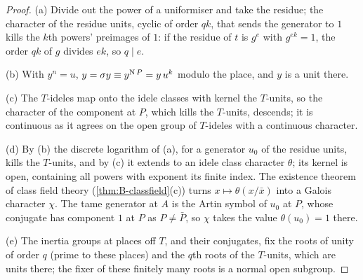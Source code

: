 \begin{proof}
(a) Divide out the power of a uniformiser and take the residue; the character of the residue units, cyclic of order $qk$, that sends the generator to $1$ kills the $k$th powers' preimages of $1$: if the residue of $t$ is $g^e$ with $g^{ek}=1$, the order $qk$ of $g$ divides $ek$, so $q\mid e$.

(b) With $y^n=u$, $y=\sigma y\equiv y^{\operatorname{N} P}=y\,u^k$ modulo the place, and $y$ is a unit there.

(c) The $T$-ideles map onto the idele classes with kernel the $T$-units, so the character of the component at $P$, which kills the $T$-units, descends; it is continuous as it agrees on the open group of $T$-ideles with a continuous character.

(d) By (b) the discrete logarithm of (a), for a generator $u_0$ of the residue units, kills the $T$-units, and by (c) it extends to an idele class character $\theta$; its kernel is open, containing all powers with exponent its finite index. The existence theorem of class field theory (\cref{thm:B-classfield}(c)) turns $x\mapsto\theta(x/\bar x)$ into a
Galois character $\chi$. The tame generator at $A$ is the Artin symbol of $u_0$ at $P$, whose conjugate has component $1$ at $P$ as $P\ne\bar P$, so $\chi$ takes the value $\theta(u_0)=1$ there.

(e) The inertia groups at places off $T$, and their conjugates, fix the roots of unity of order $q$ (prime to these places) and the $q$th roots of the $T$-units, which are units there; the fixer of these finitely many roots is a normal open subgroup.
\end{proof}


